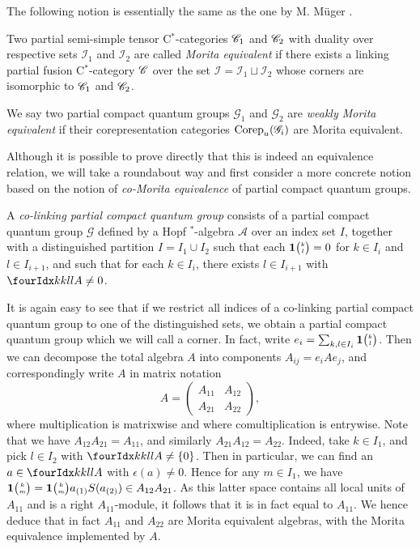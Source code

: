 The following notion is essentially the same as the one by M. M\"{u}ger \cite{Mug1}. %

\begin{Def} Two partial semi-simple tensor C$^*$-categories $\mathscr{C}_1$ and $\mathscr{C}_2$ with duality over respective sets $\mathscr{I}_1$ and $\mathscr{I}_2$ are called \emph{Morita equivalent} if there exists a linking partial fusion C$^*$-category $\mathscr{C}$ over the set $\mathscr{I}=\mathscr{I}_1\sqcup \mathscr{I}_2$ whose corners are isomorphic to $\mathscr{C}_1$ and $\mathscr{C}_2$.

We say two partial compact quantum groups $\mathscr{G}_1$ and $\mathscr{G}_2$ are \emph{weakly Morita equivalent} if their corepresentation categories $\mathrm{Corep}_u(\mathscr{G}_i)$ are Morita equivalent. 
\end{Def} 

Although it is possible to prove directly that this is indeed an equivalence relation, we will take a roundabout way and first consider a more concrete notion based on the notion of \emph{co-Morita equivalence} of partial compact quantum groups.

\begin{Def}\label{DefCoLink} A \emph{co-linking partial compact quantum group} consists of a partial compact quantum group $\mathscr{G}$ defined by a Hopf $^*$-algebra $\mathscr{A}$ over an index set $I$, together with a distinguished partition $I = I_1\cup I_2$ such that each $\mathbf{1}{\tiny {\begin{pmatrix} k\\l\end{pmatrix}}}=0$ for $k\in I_i$ and $l\in I_{i+1}$, and such that for each $k\in I_i$, there exists $l\in I_{i+1}$ with $\Gr{A}{k}{l}{k}{l}\neq 0$.  
\end{Def} 

It is again easy to see that if we restrict all indices of a co-linking partial compact quantum group to one of the distinguished sets, we obtain a partial compact quantum group which we will call a corner. In fact, write $e_i = \sum_{k,l\in I_i} \mathbf{1}{\tiny {\begin{pmatrix} k\\l\end{pmatrix}}}$. Then we can decompose the total algebra $A$ into components $A_{ij} = e_{i}Ae_{j}$, and correspondingly write $A$ in matrix notation \[ A = \begin{pmatrix} A_{11} & A_{12}  \\ A_{21} & A_{22}\end{pmatrix},\] where multiplication is matrixwise and where comultiplication is entrywise. Note that we have $A_{12}A_{21} = A_{11}$, and similarly $A_{21}A_{12} = A_{22}$. Indeed, take $k\in I_1$, and pick $l\in I_2$ with $\Gr{A}{k}{l}{k}{l}\neq \{0\}$. Then in particular, we can find an $a\in \Gr{A}{k}{l}{k}{l}$ with $\epsilon(a)\neq 0$. Hence for any $m\in I_1$, we have $\mathbf{1}{\tiny {\begin{pmatrix} k\\m\end{pmatrix}}} = \mathbf{1}{\tiny {\begin{pmatrix} k\\m\end{pmatrix}}} a_{(1)}S(a_{(2)}) \in A_{12}A_{21}$. As this latter space contains all local units of $A_{11}$ and is a right $A_{11}$-module, it follows that it is in fact equal to $A_{11}$. We hence deduce that in fact $A_{11}$ and $A_{22}$ are Morita equivalent algebras, with the Morita equivalence implemented by $A$. %

